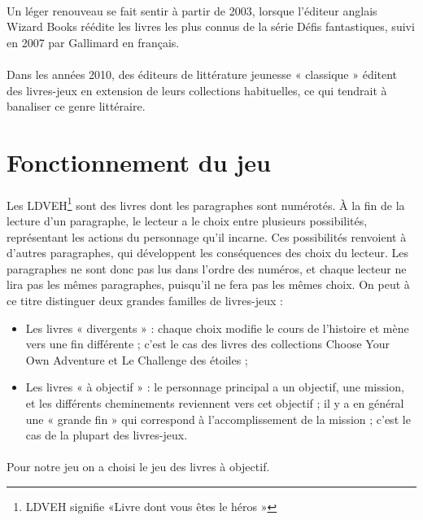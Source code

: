 \documentclass[12pt,a4paper]{article}
\begin{document}
\paragraph{}Un léger renouveau se fait sentir à partir de 2003, lorsque l'éditeur anglais Wizard Books réédite les livres les plus connus de la série Défis fantastiques, suivi en 2007 par Gallimard en français. 
\paragraph{}Dans les années 2010, des éditeurs de littérature jeunesse « classique » éditent des livres-jeux en extension de leurs collections habituelles, ce qui tendrait à banaliser ce genre littéraire.\cite{ref3}\\
\section{{Fonctionnement du jeu}}
\paragraph{}Les LDVEH\footnote{LDVEH signifie «Livre dont vous êtes le héros »} sont des livres dont les paragraphes sont numérotés. À la fin de la lecture d'un paragraphe, le lecteur a le choix entre plusieurs possibilités, représentant les actions du personnage qu'il incarne. Ces possibilités renvoient à d'autres paragraphes, qui développent les conséquences des choix du lecteur. Les paragraphes ne sont donc pas lus dans l'ordre des numéros, et chaque lecteur ne lira pas les mêmes paragraphes, puisqu'il ne fera pas les mêmes choix. On peut à ce titre distinguer deux grandes familles de livres-jeux : 
\begin{itemize}
    \item Les livres « divergents » : chaque choix modifie le cours de l'histoire et mène vers une fin différente ; c'est le cas des livres des collections Choose Your Own Adventure et Le Challenge des étoiles ;
    \item Les livres « à objectif » : le personnage principal a un objectif, une mission, et les différents cheminements reviennent vers cet objectif ; il y a en général une « grande fin » qui correspond à l'accomplissement de la mission ; c'est le cas de la plupart des livres-jeux.\cite{ref2}
    
\end{itemize}
\paragraph{}Pour notre jeu on a choisi le jeu des livres à objectif.
\end{document}
